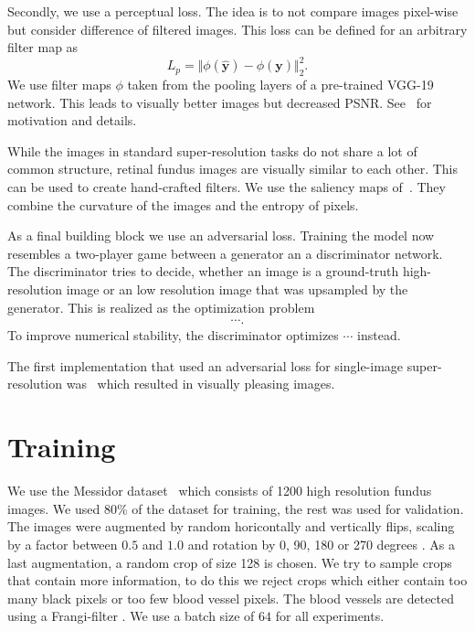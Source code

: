 \documentclass{scrartcl}
\begin{document}
Secondly, we use a perceptual loss.
The idea is to not compare images pixel-wise but consider difference of filtered images.
This loss can be defined for an arbitrary filter map as
\begin{equation}
  \label{eq:perceptual-loss}
  L_p = \Vert \phi( \bm{\hat{y}} ) - \phi (\bm{y}) \Vert_2^2 .
\end{equation}
We use filter maps $\phi$ taken from the pooling layers of a pre-trained VGG-19 network.
This leads to visually better images but decreased PSNR.
See~\cite{PerceptualLoss} for motivation and details.

While the images in standard super-resolution tasks do not share a lot of common structure, retinal fundus images are visually similar to each other.
This can be used to create hand-crafted filters.
We use the saliency maps of~\cite{SaliencyGAN}.
They combine the curvature of the images and the entropy of pixels.

As a final building block we use an adversarial loss.
Training the model now resembles a two-player game between a generator an a discriminator network.
The discriminator tries to decide, whether an image is a ground-truth high-resolution image or an low resolution image that was upsampled by the generator.
This is realized as the optimization problem~\cite{GAN}
\begin{align}
  \cdots.
\end{align}
To improve numerical stability, the discriminator optimizes \(\cdots\) instead.

The first implementation that used an adversarial loss for single-image super-resolution was~\cite{SRGAN} which resulted in visually pleasing images.

\section{Training}
We use the Messidor dataset~\cite{Messidor} which consists of 1200 high resolution fundus images.
We used 80\% of the dataset for training, the rest was used for validation.
The images were augmented by random horicontally and vertically flips, scaling by a factor between $0.5$ and $1.0$ and rotation by 0, 90, 180 or 270 degrees .
As a last augmentation, a random crop of size 128 is chosen.
We try to sample crops that contain more information, to do this we reject crops which either contain too many black pixels or too few blood vessel pixels.
The blood vessels are detected using a Frangi-filter .
We use a batch size of $64$ for all experiments.
\end{document}
